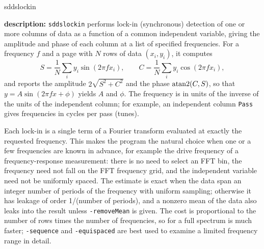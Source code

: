 \begin{sddsprog}{sddslockin}
  \item \textbf{description:}
  \verb|sddslockin| performs lock-in (synchronous) detection of one or more columns of data as a function of a common
  independent variable, giving the amplitude and phase of each column at a list of specified frequencies.  For a
  frequency $f$ and a page with $N$ rows of data $(x_i, y_i)$, it computes
  \begin{equation}
    S = \frac{1}{N}\sum_i y_i \sin(2\pi f x_i), \qquad C = \frac{1}{N}\sum_i y_i \cos(2\pi f x_i),
  \end{equation}
  and reports the amplitude $2\sqrt{S^2+C^2}$ and the phase ${\rm atan2}(C,S)$, so that $y = A\sin(2\pi f x + \phi)$
  yields $A$ and $\phi$.  The frequency is in units of the inverse of the units of the independent column; for
  example, an independent column {\tt Pass} gives frequencies in cycles per pass (tunes).

  Each lock-in is a single term of a Fourier transform evaluated at exactly the requested frequency.  This makes the
  program the natural choice when one or a few frequencies are known in advance, for example the drive frequency of a
  frequency-response measurement: there is no need to select an FFT bin, the frequency need not fall on the FFT
  frequency grid, and the independent variable need not be uniformly spaced.  The estimate is exact when the data span
  an integer number of periods of the frequency with uniform sampling; otherwise it has leakage of order 1/(number of
  periods), and a nonzero mean of the data also leaks into the result unless \verb|-removeMean| is given.  The cost is
  proportional to the number of rows times the number of frequencies, so for a full spectrum  is much
  faster; \verb|-sequence| and \verb|-equispaced| are best used to examine a limited frequency range in detail.


\end{sddsprog}
